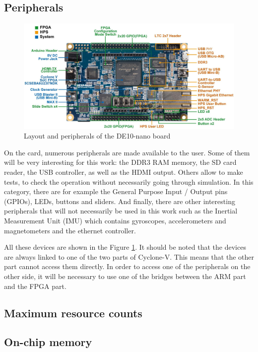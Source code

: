 \documentclass[12pt]{article}
\begin{document}
\subsection{Peripherals}

\begin{figure}[ht!]
  \center
  \includegraphics[width=12cm]{"res/chapter1/layout_components.png"}
  \caption{Layout and peripherals of the DE10-nano board}
  \label{fig:de10nano_peripherals}
\end{figure}

On the card, numerous peripherals are made available to the user. Some of them will be very interesting for this work: the DDR3 RAM memory, the SD card reader, the USB controller, as well as the HDMI output. Others allow to make tests, to check the operation without necessarily going through simulation. In this category, there are for example the General Purpose Input / Output pins (GPIOs), LEDs, buttons and sliders. And finally, there are other interesting peripherals that will not necessarily be used in this work such as the Inertial Measurement Unit (IMU) which contains gyroscopes, accelerometers and magnetometers and the ethernet controller.

\vspace{12pt}
All these devices are shown in the Figure \ref{fig:de10nano_peripherals}. It should be noted that the devices are always linked to one of the two parts of Cyclone-V. This means that the other part cannot access them directly. In order to access one of the peripherals on the other side, it will be necessary to use one of the bridges between the ARM part and the FPGA
part.

\subsection{Maximum resource counts}

\subsection{On-chip memory}
\end{document}

